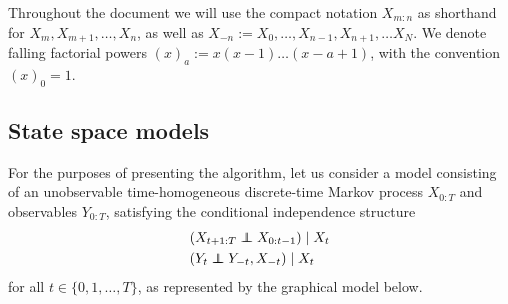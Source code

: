 \documentclass[fleqn]{article}
\theoremstyle{definition}
\newcommand\indep{\protect\mathpalette{\protect\independenT}{\perp}}
\def\independenT#1#2{\mathrel{\rlap{$#1#2$}\mkern2mu{#1#2}}}
\begin{document}
%

Throughout the document we will use the compact notation $X_{m:n}$ as shorthand for $X_m, X_{m+1}, \dots, X_n$, as well as $X_{-n} := X_0, \dots, X_{n-1}, X_{n+1}, \dots X_{N}$.
We denote falling factorial powers $(x)_a := x(x-1)\dots(x-a+1)$, with the convention $(x)_0 = 1$.


\subsection{State space models}
For the purposes of presenting the algorithm, let us consider a model consisting of an unobservable time-homogeneous discrete-time Markov process $X_{0:T}$ and observables $Y_{0:T}$, satisfying the conditional independence structure
\begin{align*}
& (X_{t+1:T} \indep X_{0:t-1}) \mid X_t \\
& (Y_t \indep Y_{-t}, X_{-t}) \mid X_t
\end{align*}
for all $t \in \{0,1,\dots, T\}$, as represented by the graphical model below.

\begin{center}
\end{center}
\end{document}
